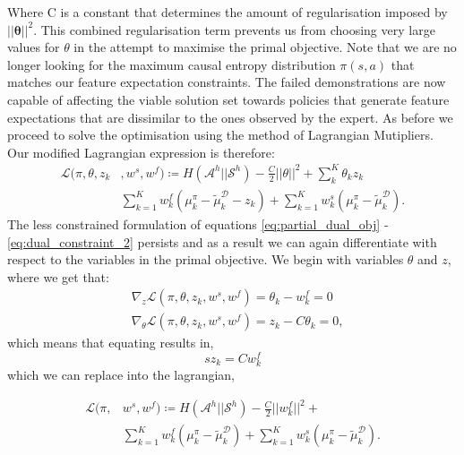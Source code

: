 \documentclass[letterpaper]{article}
\begin{document}
Where C is a constant that determines the amount of regularisation imposed by $||\mathbf{\theta}||^2$. This combined regularisation term prevents us from choosing very large values for $\theta$ in the attempt to maximise the primal objective. Note that we are no longer looking for the maximum causal entropy distribution $\pi(s,a)$ that matches our feature expectation constraints. The failed demonstrations are now capable of affecting the viable solution set towards policies that generate feature expectations that are dissimilar to the ones observed by the expert. As before we proceed to solve the optimisation using the method of Lagrangian Mutipliers. Our modified Lagrangian expression is therefore:
\begin{equation}
\begin{split}
\label{eq:partial_lagrangian_failure}
\mathcal{L}(\pi,\theta,z_k &,w^s,w^f)\coloneqq  H(\mathcal{A}^h||\mathcal{S}^h) - \frac{C}{2}||\theta||^2 + \sum_k^K\theta_kz_k \\
&\sum_{k=1}^Kw^f_k (\mu^{\pi}_k -\widetilde{\mu}^{\mathcal{D}}_k - z_k) + \sum_{k=1}^Kw^s_k(\mu^{\pi}_k-\widetilde{\mu}^{\mathcal{D}}_k).
\end{split}
\end{equation}
The less constrained formulation of equations \eqref{eq:partial_dual_obj} - \eqref{eq:dual_constraint_2} persists and as a result we can
again differentiate with respect to the variables in the primal objective. We begin with variables $\theta$ and $z$, where we get that:
\begin{align}
	&\nabla_{z}\mathcal{L}(\pi,\theta,z_k,w^s,w^f) = \theta_k - w^f_k  = 0\\
	&\nabla_{\theta}\mathcal{L}(\pi,\theta,z_k,w^s,w^f) = z_k - C\theta_k = 0,
\end{align}
which means that equating results in,
\begin{equation}s
	z_k = Cw^f_k
\end{equation}
which we can replace into the lagrangian,

\begin{equation}
\begin{split}
\label{eq:partial_lagrangian_failure}
\mathcal{L}(\pi,&w^s,w^f)\coloneqq  H(\mathcal{A}^h||\mathcal{S}^h) - \frac{C}{2}||w^f_k||^2 +\\ 
&\sum_{k=1}^Kw^f_k (\mu^{\pi}_k -\widetilde{\mu}^{\mathcal{D}}_k) + \sum_{k=1}^Kw^s_k(\mu^{\pi}_k-\widetilde{\mu}^{\mathcal{D}}_k).
\end{split}
\end{equation}
\end{document}
